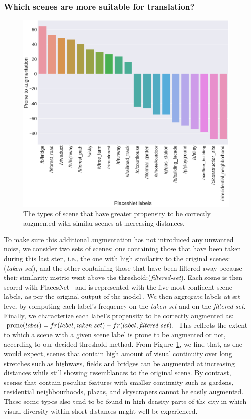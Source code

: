 \subsubsection{Which scenes are more suitable for translation?}
\begin{figure}[t!]
    \centering
    \includegraphics[width=\columnwidth]{SimilarityPlacesPrevalence.png}
    \caption{The types of scene that have greater propensity to be correctly augmented with similar scenes at increasing distances.}
    \label{fig:augmentationSimilarity}
\end{figure}
To make sure this additional augmentation has not introduced any unwanted noise, we consider  two sets of scenes: one containing those that have been taken during this last step, i.e., the one with high similarity to the original scenes:(\emph{taken-set}), and the other containing those that have been filtered away because their similarity metric went above the threshold:(\emph{filtered-set}). Each scene is then scored with PlacesNet~\cite{zhou2014learning} and is represented with the five most confident scene labels, as per the original output of the model . We then aggregate labels at set level by computing each label's frequency on the \emph{taken-set} 
and on the \emph{filtered-set}. Finally, we characterize each label's propensity to be correctly augmented as: 
$ \textrm{prone}(label)= fr(label,\textrm{\emph{taken-set}}) - fr(label,\textrm{\emph{filtered-set}}).$
This reflects the extent to which a scene with a given scene label is prone to be augmented or not, according to our decided threshold method. From Figure~\ref{fig:augmentationSimilarity}, we find that, as one would expect, scenes that contain high amount of visual continuity over long stretches such as highways, fields and bridges can be augmented at increasing distances while still showing resemblances to the original scene. By contrast, scenes that contain peculiar features with smaller continuity such as gardens, residential neighbourhoods, plazas, and skyscrapers cannot be easily augmented. These scene types also tend to be found in high density parts of the city in which visual diversity within short distances might well be experienced. 


